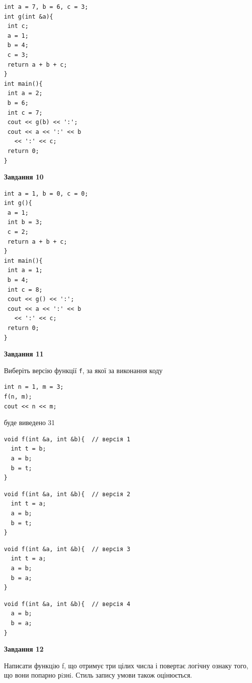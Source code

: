 \documentclass[12pt, ukrainian]{article}
\def\code#1{\Verb!#1!}
\begin{document}
{\begin {large}
\begin{minipage}[t]{7.0cm}
\begin{verbatim}
int a = 7, b = 6, c = 3;
int g(int &a){
 int c;
 a = 1;
 b = 4;
 c = 3;
 return a + b + c;
}
int main(){
 int a = 2;
 b = 6;
 int c = 7;
 cout << g(b) << ':';
 cout << a << ':' << b 
   << ':' << c;
 return 0;
}
\end{verbatim}



\begin{center}
\textbf{Завдання 10}
\end{center}
\vspace{-8mm}

\begin{verbatim}
int a = 1, b = 0, c = 0;
int g(){
 a = 1;
 int b = 3;
 c = 2;
 return a + b + c;
}
int main(){
 int a = 1;
 b = 4;
 int c = 8;
 cout << g() << ':';
 cout << a << ':' << b 
   << ':' << c;
 return 0;
}
\end{verbatim}

\end{minipage}
\vline \hspace{1mm}
\begin{minipage}[t]{11.0cm}

\begin{center}
\textbf{Завдання 11}
\end{center}
Виберіть версію функції \code{f}, за якої за виконання коду
\begin{verbatim}
int n = 1, m = 3;
f(n, m);
cout << n << m;
\end{verbatim}

буде виведено 31

\begin{verbatim}
void f(int &a, int &b){  // версія 1
  int t = b;
  a = b;
  b = t;
}
\end{verbatim}

\vspace{-8mm}\begin{verbatim}
void f(int &a, int &b){  // версія 2
  int t = a;
  a = b;
  b = t;
}
\end{verbatim}

\vspace{-8mm}\begin{verbatim}
void f(int &a, int &b){  // версія 3
  int t = a;
  a = b;
  b = a;
}
\end{verbatim}

\vspace{-8mm}\begin{verbatim}
void f(int &a, int &b){  // версія 4
  a = b;
  b = a;
}
\end{verbatim}



\begin{center}
\textbf{Завдання 12}
\end{center}

Написати функцiю f, що отримує три цілих числа і повертає логічну ознаку того, що вони попарно рiзнi. Стиль запису умови також оцінюється.\par

\end{minipage}

\end {large}}
\newpage
\end{document}
